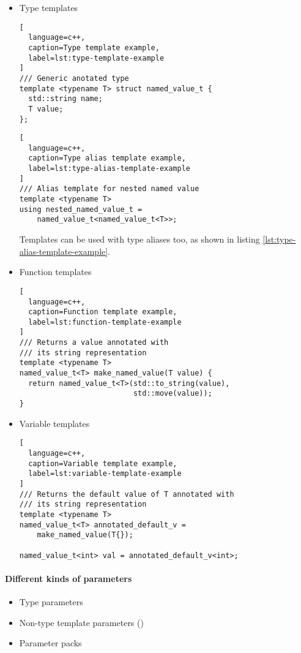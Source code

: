 \documentclass[../main]{subfiles}
\begin{document}
\begin{itemize}
\item Type templates

\begin{lstlisting}[
  language=c++,
  caption=Type template example,
  label=lst:type-template-example
]
/// Generic anotated type
template <typename T> struct named_value_t {
  std::string name;
  T value;
};
\end{lstlisting}

\begin{lstlisting}[
  language=c++,
  caption=Type alias template example,
  label=lst:type-alias-template-example
]
/// Alias template for nested named value
template <typename T>
using nested_named_value_t =
    named_value_t<named_value_t<T>>;
\end{lstlisting}

Templates can be used with type aliases too, as shown in
listing \ref{lst:type-alias-template-example}.

\item Function templates

\begin{lstlisting}[
  language=c++,
  caption=Function template example,
  label=lst:function-template-example
]
/// Returns a value annotated with
/// its string representation
template <typename T>
named_value_t<T> make_named_value(T value) {
  return named_value_t<T>(std::to_string(value),
                          std::move(value));
}
\end{lstlisting}

\item Variable templates

\begin{lstlisting}[
  language=c++,
  caption=Variable template example,
  label=lst:variable-template-example
]
/// Returns the default value of T annotated with
/// its string representation
template <typename T>
named_value_t<T> annotated_default_v =
    make_named_value(T{});

named_value_t<int> val = annotated_default_v<int>;
\end{lstlisting}

\end{itemize}

\paragraph{Different kinds of parameters}

\begin{itemize}
\item Type parameters
\item Non-type template parameters (\nttp)
\item Parameter packs
\end{itemize}
\end{document}
